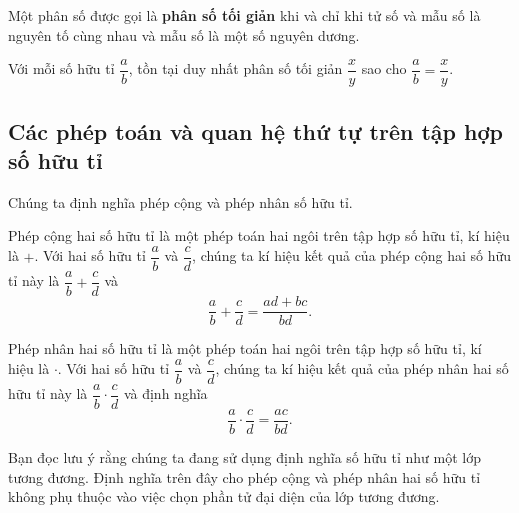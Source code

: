 \begin{theorem}
    Một phân số được gọi là \textbf{phân số tối giản} khi và chỉ khi tử số và mẫu số là nguyên tố cùng nhau và mẫu số là một số nguyên dương.
    
    Với mỗi số hữu tỉ $\dfrac{a}{b}$, tồn tại duy nhất phân số tối giản $\dfrac{x}{y}$ sao cho $\dfrac{a}{b} = \dfrac{x}{y}$.
\end{theorem}

\subsection{Các phép toán và quan hệ thứ tự trên tập hợp số hữu tỉ}

Chúng ta định nghĩa phép cộng và phép nhân số hữu tỉ.
\begin{definition}
    Phép cộng hai số hữu tỉ là một phép toán hai ngôi trên tập hợp số hữu tỉ, kí hiệu là $+$. Với hai số hữu tỉ $\dfrac{a}{b}$ và $\dfrac{c}{d}$, chúng ta kí hiệu kết quả của phép cộng hai số hữu tỉ này là $\dfrac{a}{b} + \dfrac{c}{d}$ và
    \[
        \frac{a}{b} + \frac{c}{d} = \frac{a d + b c}{b d}.
    \]
\end{definition}

\begin{definition}
    Phép nhân hai số hữu tỉ là một phép toán hai ngôi trên tập hợp số hữu tỉ, kí hiệu là $\cdot$. Với hai số hữu tỉ $\dfrac{a}{b}$ và $\dfrac{c}{d}$, chúng ta kí hiệu kết quả của phép nhân hai số hữu tỉ này là $\dfrac{a}{b}\cdot\dfrac{c}{d}$ và định nghĩa
    \[
        \frac{a}{b}\cdot\frac{c}{d} = \frac{ac}{bd}.
    \]
\end{definition}

Bạn đọc lưu ý rằng chúng ta đang sử dụng định nghĩa số hữu tỉ như một lớp tương đương. Định nghĩa trên đây cho phép cộng và phép nhân hai số hữu tỉ không phụ thuộc vào việc chọn phần tử đại diện của lớp tương đương.

